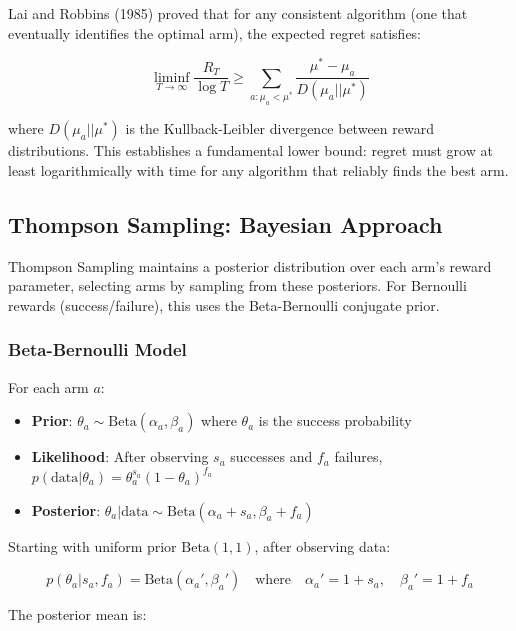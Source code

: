 Lai and Robbins (1985) proved that for any consistent algorithm (one that eventually identifies the optimal arm), the expected regret satisfies:

\begin{equation}
\liminf_{T \to \infty} \frac{R_T}{\log T} \geq \sum_{a: \mu_a < \mu^*} \frac{\mu^* - \mu_a}{D(\mu_a || \mu^*)}
\end{equation}

where $D(\mu_a || \mu^*)$ is the Kullback-Leibler divergence between reward distributions. This establishes a fundamental lower bound: regret must grow at least logarithmically with time for any algorithm that reliably finds the best arm.

\subsection{Thompson Sampling: Bayesian Approach}

Thompson Sampling maintains a posterior distribution over each arm's reward parameter, selecting arms by sampling from these posteriors. For Bernoulli rewards (success/failure), this uses the Beta-Bernoulli conjugate prior.

\subsubsection{Beta-Bernoulli Model}

For each arm $a$:
\begin{itemize}
    \item \textbf{Prior}: $\theta_a \sim \text{Beta}(\alpha_a, \beta_a)$ where $\theta_a$ is the success probability
    \item \textbf{Likelihood}: After observing $s_a$ successes and $f_a$ failures, $p(\text{data} | \theta_a) = \theta_a^{s_a} (1 - \theta_a)^{f_a}$
    \item \textbf{Posterior}: $\theta_a | \text{data} \sim \text{Beta}(\alpha_a + s_a, \beta_a + f_a)$
\end{itemize}

Starting with uniform prior $\text{Beta}(1, 1)$, after observing data:

\begin{equation}
p(\theta_a | s_a, f_a) = \text{Beta}(\alpha_a', \beta_a') \quad \text{where} \quad \alpha_a' = 1 + s_a, \quad \beta_a' = 1 + f_a
\end{equation}

The posterior mean is:

